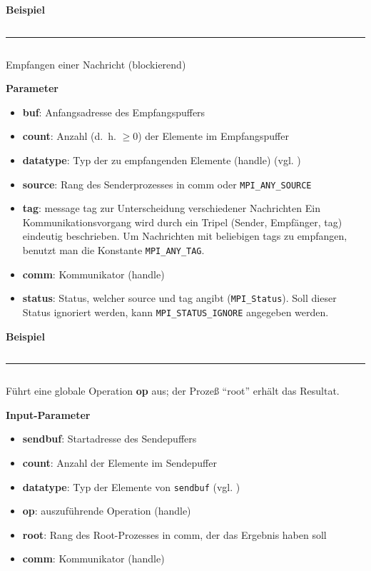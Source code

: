 \textbf{Beispiel}
\inputminted[numbersep=5pt, tabsize=4]{c}{scripts/mpi/mpi-send-example.c}
\goodbreak
\rule{\textwidth}{0.4pt}%
\inputminted[numbersep=5pt, tabsize=4]{c}{scripts/mpi/mpi-receive.c}
Empfangen einer Nachricht (blockierend) 

\textbf{Parameter}
\begin{itemize}
    \item \textbf{buf}: Anfangsadresse des Empfangspuffers
    \item \textbf{count}: Anzahl (d.~h. $\geq 0$) der Elemente im Empfangspuffer
    \item \textbf{datatype}: Typ der zu empfangenden Elemente (handle) (vgl. )
    \item \textbf{source}: Rang des Senderprozesses in comm oder \texttt{MPI\_ANY\_SOURCE}
    \item \textbf{tag}: message tag zur Unterscheidung verschiedener Nachrichten
                  Ein Kommunikationsvorgang wird durch ein Tripel (Sender, Empfänger, tag) eindeutig beschrieben. Um Nachrichten mit beliebigen tags zu empfangen, benutzt man die Konstante \texttt{MPI\_ANY\_TAG}.
    \item \textbf{comm}: Kommunikator (handle) 
    \item \textbf{status}: Status, welcher source und tag angibt (\texttt{MPI\_Status}).
          Soll dieser Status ignoriert werden, kann \texttt{MPI\_STATUS\_IGNORE} angegeben werden.
\end{itemize}

\textbf{Beispiel}
\inputminted[numbersep=5pt, tabsize=4]{c}{scripts/mpi/mpi-receive-example.c}
\goodbreak
\rule{\textwidth}{0.4pt}%
\inputminted[numbersep=5pt, tabsize=4]{c}{scripts/mpi/mpi-reduce.c}
Führt eine globale Operation \textbf{op} aus; der Prozeß \enquote{root} erhält das Resultat.

\textbf{Input-Parameter}
\begin{itemize}
    \item \textbf{sendbuf}: Startadresse des Sendepuffers
    \item \textbf{count}: Anzahl der Elemente im Sendepuffer
    \item \textbf{datatype}: Typ der Elemente von \texttt{sendbuf} (vgl. )
    \item \textbf{op}: auszuführende Operation (handle)
    \item \textbf{root}: Rang des Root-Prozesses in comm, der das Ergebnis haben soll
    \item \textbf{comm}: Kommunikator (handle)
\end{itemize}

